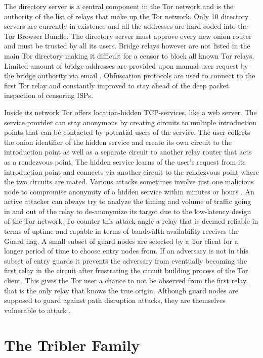 \documentclass[conference,compsoc]{IEEEtran}
\begin{document}
The directory server is a central component in the Tor network and is the authority of the list of relays that make up the Tor network.
Only 10 directory servers are currently in existence and all the addresses are hard coded into the Tor Browser Bundle.
The directory server must approve every new onion router and must be trusted by all its users.
Bridge relays however are not listed in the main Tor directory making it difficult for a censor to block all known Tor relays.
Limited amount of bridge addresses are provided upon manual user request by the bridge authority via email \cite{tor2015bridges}.
Obfuscation protocols are used to connect to the first Tor relay and constantly improved to stay ahead of the deep packet inspection of censoring ISPs.

Inside its network Tor offers location-hidden TCP-services, like a web server.
The service provider can stay anonymous by creating circuits to multiple introduction points that can be contacted by potential users of the service.
The user collects the onion identifier of the hidden service and create its own circuit to the introduction point as well as a separate circuit to another relay router that acts as a rendezvous point.
The hidden service learns of the user's request from its introduction point and connects via another circuit to the rendezvous point where the two circuits are mated.
Various attacks \cite{4725864} \cite{6682740} sometimes involve just one malicious node to compromise anonymity of a hidden service within minutes or hours \cite{1624004}. An active attacker can always try to analyze the timing and volume of traffic going in and out of the relay to de-anonymize its target due to the low-latency design of the Tor network. \cite{Tang:2010:IAT:1866307.1866345}
To counter this attack angle a relay that is deemed reliable in terms of uptime and capable in terms of bandwidth availability receives the Guard flag.
A small subset of guard nodes are selected by a Tor client for a longer period of time to choose entry nodes from.
If an adversary is not in this subset of entry guards it prevents the adversary from eventually becoming the first relay in the circuit after frustrating the circuit building process of the Tor client.
This gives the Tor user a chance to not be observed from the first relay, that is the only relay that knows the true origin.
Although guard nodes are supposed to guard against path disruption attacks, they are themselves vulnerable to attack \cite{Bauer:2007:LRA:1314333.1314336}.


\section{The Tribler Family}
\end{document}
